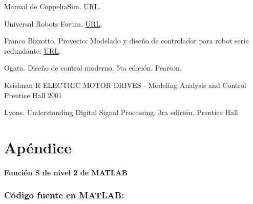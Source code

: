\documentclass{article}
\begin{document}
\begin{sloppypar}
Manual de CoppeliaSim.
\href{https://manual.coppeliarobotics.com/}{URL}.

Universal Robots Forum.
\href{https://forum.universal-robots.com/}{URL}.

Franco Bizzotto. Proyecto: Modelado y diseño de controlador para robot serie redundante.
\href{https://github.com/carloshernangarrido/control/blob/master/12_anteproyecto_proyecto-final/Bizzotto_Robot-serie.pdf}{URL}.

Ogata. Diseño de control moderno. 5ta edición. Pearson.

Krishnan R ELECTRIC MOTOR DRIVES - Modeling Analysis and Control Prentice Hall 2001

Lyons. Understanding Digital Signal Processing. 3ra edición, Prentice Hall



\printbibliography%


\section*{Apéndice}

\paragraph*{Función S de nivel 2 de MATLAB}
\label{sec:Función S de nivel 2 de MATLAB}
\hfill



\subsubsection*{Código fuente en MATLAB:}
\label{sec:Código fuente en MATLAB:}
\hfill







\end{sloppypar}
\end{document}
